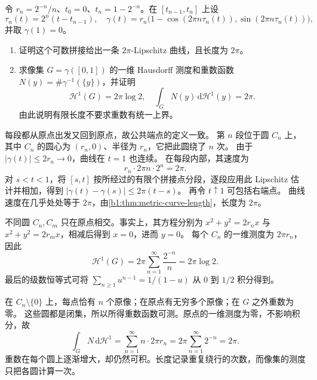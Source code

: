 \begin{optionalexercise}\label{b1:ex:17-unbounded-multiplicity-curve}
令 \(r_n=2^{-n}/n\)、\(t_0=0\)、\(t_n=1-2^{-n}\)。在 \([t_{n-1},t_n]\) 上设
\[
 \tau_n(t)=2^n(t-t_{n-1}),
 \quad
 \gamma(t)=r_n\bigl(1-\cos(2\pi n\tau_n(t)),
                         \sin(2\pi n\tau_n(t))\bigr),
\]
并取 \(\gamma(1)=0\)。
\begin{enumerate}
\item\label{b1:item:17-countable-loop-lipschitz}
证明这个可数拼接给出一条 \(2\pi\)-Lipschitz 曲线，且长度为 \(2\pi\)。
\item\label{b1:item:17-countable-loop-multiplicity}
求像集 \(G=\gamma([0,1])\) 的一维 Hausdorff 测度和重数函数
\(N(y)=\#\gamma^{-1}(\{y\})\)，并证明
\[
 \mathcal H^1(G)=2\pi\log2,
 \quad \int_GN(y)\,\mathrm d\mathcal H^1(y)=2\pi.
\]
由此说明有限长度不要求重数有统一上界。
\end{enumerate}
\end{optionalexercise}
\begin{solution}
每段都从原点出发又回到原点，故公共端点的定义一致。
第 \(n\) 段位于圆 \(C_n\) 上，其中 \(C_n\) 的圆心为 \((r_n,0)\)、半径为 \(r_n\)，它把此圆绕了 \(n\) 次。
由于 \(|\gamma(t)|\le2r_n\to0\)，曲线在 \(t=1\) 也连续。
在每段内部，其速度为
\[
 r_n\cdot2\pi n\cdot2^n=2\pi.
\]
对 \(s<t<1\)，将 \([s,t]\) 按所经过的有限个拼接点分段，逐段应用此 Lipschitz 估计并相加，得到 \(|\gamma(t)-\gamma(s)|\le2\pi(t-s)\)。
再令 \(t\uparrow1\) 可包括右端点。
曲线速度在几乎处处等于 \(2\pi\)，由\cref{b1:thm:metric-curve-length}，长度为 \(2\pi\)。

不同圆 \(C_n,C_m\) 只在原点相交。事实上，其方程分别为
\(x^2+y^2=2r_nx\) 与 \(x^2+y^2=2r_mx\)，相减后得到 \(x=0\)，进而 \(y=0\)。
每个 \(C_n\) 的一维测度为 \(2\pi r_n\)，因此
\[
 \mathcal H^1(G)=2\pi\sum_{n=1}^{\infty}\frac{2^{-n}}n=2\pi\log2.
\]
最后的级数恒等式可将 \(\sum_{n\ge1}u^{n-1}=1/(1-u)\) 从 \(0\) 到 \(1/2\) 积分得到。

在 \(C_n\setminus\{0\}\) 上，每点恰有 \(n\) 个原像；在原点有无穷多个原像；在 \(G\) 之外重数为零。
这些圆都是闭集，所以所得重数函数可测。原点的一维测度为零，不影响积分，故
\[
 \int_GN\,\mathrm d\mathcal H^1
 =\sum_{n=1}^{\infty}n\cdot2\pi r_n
 =2\pi\sum_{n=1}^{\infty}2^{-n}=2\pi.
\]
重数在每个圆上逐渐增大，却仍然可积。长度记录重复绕行的次数，而像集的测度只把各圆计算一次。
\end{solution}


